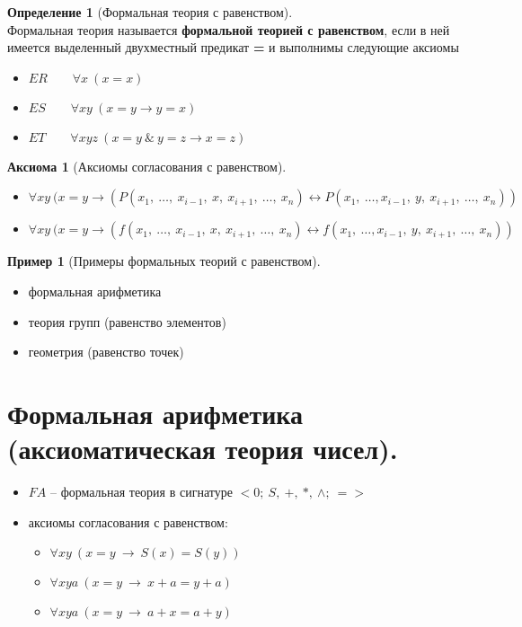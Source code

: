 \documentclass[a4paper,12pt]{article}
\theoremstyle{definition} %
\newtheorem{definition}{Определение}[section]
\newtheorem{example}{Пример}[section]
\newtheorem{axiom}{Аксиома}[section]
\theoremstyle{definition} %
\theoremstyle{remark} %
\begin{document}
	\begin{definition}[Формальная теория с равенством]\ \\[1ex]
		Формальная теория называется \textbf{формальной теорией с равенством}, если в ней имеется выделенный двухместный предикат \textbf{=} и выполнимы следующие аксиомы
		\begin{itemize}
			\item $ER \qquad \forall x \ (x = x)$ 
			\item $ES \qquad \forall xy \ (x = y \rightarrow y = x)$
			\item $ET \qquad \forall xyz \ (x = y \ \& \ y = z \rightarrow x = z)$
		\end{itemize}
	
		\begin{axiom}[Аксиомы согласования с равенством]\
			\begin{itemize}
				\item $\forall xy \ (x = y \rightarrow (P(x_1, \ \dots, \ x_{i - 1}, \ x, \ x_{i + 1}, \ \dots , \ x_n) \leftrightarrow P(x_1, \ \dots , x_{i - 1}, \ y, \ x_{i + 1}, \ \dots , \ x_n ))$
				\item $\forall xy \ (x = y \rightarrow (f(x_1, \ \dots, \ x_{i - 1}, \ x, \ x_{i + 1}, \ \dots , \ x_n) \leftrightarrow f(x_1, \ \dots , x_{i - 1}, \ y, \ x_{i + 1}, \ \dots , \ x_n ))$
			\end{itemize}
		\end{axiom}
	\end{definition}

	\begin{example}[Примеры формальных теорий с равенством]\
		\begin{itemize}
			\item формальная арифметика
			\item теория групп (равенство элементов)
			\item геометрия (равенство точек)
		\end{itemize}
	\end{example}

\section{Формальная арифметика (аксиоматическая теория чисел).}
	\begin{itemize}
		\item $FA$ -- формальная теория в сигнатуре $<0; \ S, \ +, \ *, \ \wedge ; \ = >$
	\item аксиомы согласования с равенством:
		\begin{itemize}
			\item $\forall xy \ (x = y \ \rightarrow \ S(x) = S(y))$
			\item $\forall xya \ (x = y \ \rightarrow \ x + a = y + a)$
			\item $\forall xya \ (x = y \ \rightarrow \ a + x = a + y)$
		\end{itemize}
	\end{itemize}
\end{document}
